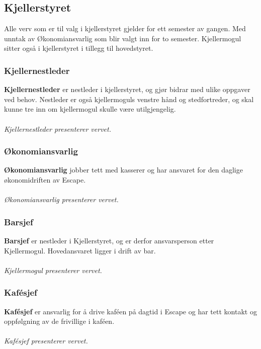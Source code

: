 \documentclass[10pt,norsk,a4paper]{article}
\begin{document}
\newpage
\subsection{Kjellerstyret} 
Alle verv som er til valg i kjellerstyret gjelder for ett semester av 
gangen. Med unntak av Økonomiansvarlig som blir valgt inn for to semester.
Kjellermogul sitter også i kjellerstyret i tillegg til hovedstyret. 

\begin{multicols}{2}

\subsubsection{Kjellernestleder}

\textbf{Kjellernestleder} er nestleder i kjellerstyret, og gjør bidrar
med ulike oppgaver ved behov. Nestleder er også kjellermoguls venstre
hånd og stedfortreder, og skal kunne tre inn om kjellermogul skulle være
utilgjengelig.\\\\
\textit{Kjellernestleder presenterer vervet.}

\subsubsection{Økonomiansvarlig}
\textbf{Økonomiansvarlig} jobber tett med kasserer og har ansvaret for
den daglige økonomidriften av Escape.\\\\
\textit{Økonomiansvarlig presenterer vervet.}

\subsubsection{Barsjef}
\textbf{Barsjef} er nestleder i Kjellerstyret, og er derfor
ansvarsperson etter Kjellermogul. Hovedansvaret ligger i drift av bar. \\\\
\textit{Kjellermogul presenterer vervet.}

\subsubsection{Kafésjef}
\textbf{Kafésjef} er ansvarlig for å drive kaféen på dagtid i Escape og
har tett kontakt og oppfølgning av de frivillige i kaféen.
\\\\\textit{Kafésjef presenterer vervet.}


\end{multicols}
\end{document}
